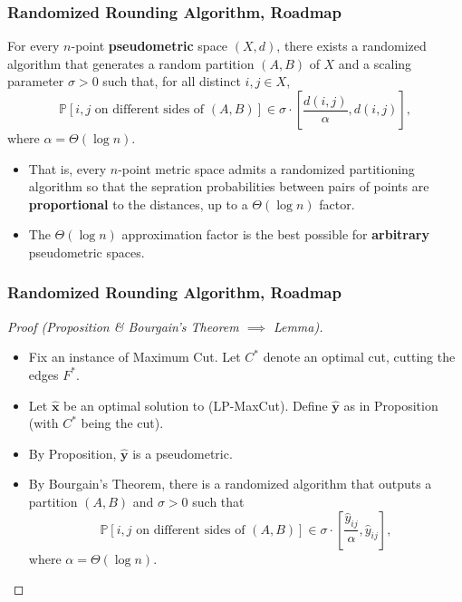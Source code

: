 \documentclass{beamer}
\newcommand{\PP}{\mathbb{P}}
\begin{document}
    \begin{frame}
        \frametitle{Randomized Rounding Algorithm, Roadmap}
    
        \begin{theorem}
            For every $n$-point {\bf pseudometric} space $(X, d)$, there exists a randomized algorithm that generates a random partition $(A, B)$ of $X$ and a scaling parameter $\sigma > 0$ such that, for all distinct $i, j \in X$,
            $$ \PP[\text{$i, j$ on different sides of $(A, B)$}] \in \sigma \cdot \left[\frac{d(i, j)}{\alpha}, d(i, j)\right], $$
            where $\alpha = \Theta(\log n)$.
        \end{theorem}

        \pause

        \begin{itemize}
            \item That is, every $n$-point metric space admits a randomized partitioning algorithm so that the sepration probabilities between pairs of points are {\bf proportional} to the distances, up to a $\Theta(\log n)$ factor. \pause
            \item The $\Theta(\log n)$ approximation factor is the best possible for {\bf arbitrary} pseudometric spaces.
        \end{itemize}
    \end{frame}

    \begin{frame}
        \frametitle{Randomized Rounding Algorithm, Roadmap}
    
        \begin{proof}[Proof (Proposition \& Bourgain's Theorem $\implies$ Lemma)]
            \renewcommand{\qedsymbol}{}
            \begin{itemize}
                \item Fix an instance of {\sc Maximum Cut}. Let $C^*$ denote an optimal cut, cutting the edges $F^*$. \pause
                \item Let $\mathbf{\hat x}$ be an optimal solution to {\sc (LP-MaxCut)}. Define $\mathbf{\hat y}$ as in Proposition (with $C^*$ being the cut). \pause
                \item By Proposition, $\mathbf{\hat y}$ is a pseudometric. \pause
                \item By Bourgain's Theorem, there is a randomized algorithm that outputs a partition $(A, B)$ and $\sigma > 0$ such that
                $$ \PP[\text{$i, j$ on different sides of $(A, B)$}] \in \sigma \cdot \left[\frac{\hat y_{ij}}{\alpha}, \hat y_{ij}\right], $$
                where $\alpha = \Theta(\log n)$.
            \end{itemize}
        \end{proof}
    \end{frame}
\end{document}
